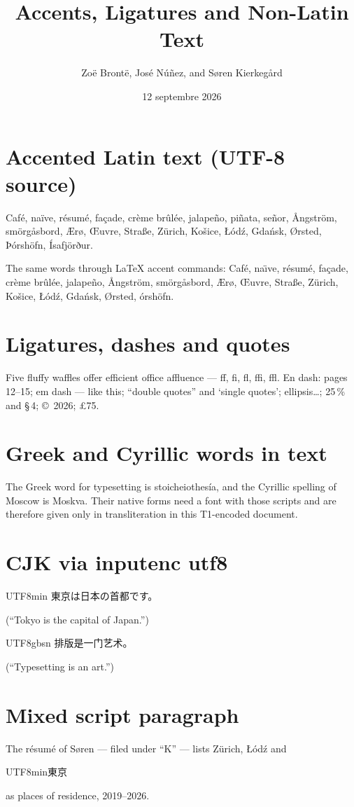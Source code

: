 \documentclass[11pt]{article}
\title{Accents, Ligatures and Non-Latin Text}
\author{Zoë Brontë, José Núñez, and Søren Kierkegård}
\date{12 septembre 2026}
\begin{document}
\maketitle

\section{Accented Latin text (UTF-8 source)}
Café, naïve, résumé, façade, crème brûlée, jalapeño, piñata, señor,
Ångström, smörgåsbord, Ærø, Œuvre, Straße, Zürich, Košice, Łódź,
Gdańsk, Ørsted, Þórshöfn, Ísafjörður.

The same words through \LaTeX{} accent commands:
Caf\'e, na\"\i ve, r\'esum\'e, fa\c{c}ade, cr\`eme br\^ul\'ee, jalape\~no,
\AA ngstr\"om, sm\"org\aa sbord, \AE r\o, \OE uvre, Stra\ss e, Z\"urich,
Ko\v{s}ice, \L\'od\'z, Gda\'nsk, \O rsted, \TH \'orsh\"ofn.

\section{Ligatures, dashes and quotes}
Five fluffy waffles offer efficient office affluence --- ff, fi, fl, ffi, ffl.
En dash: pages 12--15; em dash --- like this; ``double quotes'' and `single
quotes'; ellipsis\dots; 25\,\% and \S\,4; \copyright~2026; \pounds 75.

\section{Greek and Cyrillic words in text}
The Greek word for typesetting is stoicheiothesía, and the Cyrillic spelling
of Moscow is Moskva. Their native forms need a font with those scripts and
are therefore given only in transliteration in this T1-encoded document.

\section{CJK via inputenc utf8}
\begin{CJK}{UTF8}{min}
東京は日本の首都です。
\end{CJK}
(``Tokyo is the capital of Japan.'')

\begin{CJK}{UTF8}{gbsn}
排版是一门艺术。
\end{CJK}
(``Typesetting is an art.'')

\section{Mixed script paragraph}
The r\'esum\'e of Søren --- filed under ``K'' --- lists Zürich, Łódź and
\begin{CJK}{UTF8}{min}東京\end{CJK} as places of residence, 2019--2026.
\end{document}
